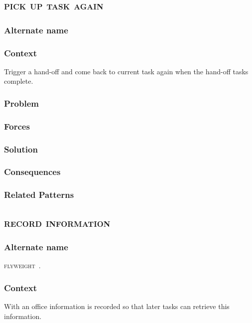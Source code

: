 \documentclass[prodmode]{style/acmlarge}
\begin{document}
\subsection{\textsc{\textbf{pick up task again}}}

\subsubsection*{Alternate name}

\subsubsection*{Context} Trigger a hand-off and come back to current task again
when the hand-off tasks complete.

\subsubsection*{Problem}

\subsubsection*{Forces}

\subsubsection*{Solution}

\subsubsection*{Consequences}

\subsubsection*{Related Patterns}



\subsection{\textsc{\textbf{record information}}}

\subsubsection*{Alternate name} \textsc{flyweight}~\cite{gof}.

\subsubsection*{Context} With an office information is recorded so that later
tasks can retrieve this information.
\end{document}
